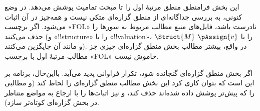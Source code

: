 \documentclass[../../include/open-logic-part]{subfiles}
\begin{document}

\begin{editorial}
  این بخش فرامنطق منطق مرتبهٔ اول را تا مبحث تمامیت پوشش می‌دهد. در وضع
  کنونی، به بررسی جداگانه‌ای از منطق گزاره‌ای متکی نیست و همه‌چیز در آن
  اثبات می‌شود. اگر برچسب «FOL» نادرست باشد، فایل‌های منبع مطالب مربوط
  به سورها را حذف می‌کنند (و «!!{structure}» را با «!!{valuation}»،
  $\Struct{M}$ را با $\pAssign{v}$ و مانند آن جایگزین می‌کنند). در واقع،
  بیشتر مطالب بخش منطق گزاره‌ای چیزی جز مطالب مرتبهٔ اول با برچسب
  «FOL» خاموش نیست.

  اگر بخش منطق گزاره‌ای گنجانده شود، تکرار فراوانی پدید می‌آید. بااین‌حال،
  برنامه بر این است که بتوان کاری کرد این بخش مطالب منطق گزاره‌ای را
  لحاظ کند (و مطالبی را که پیش‌تر پوشش داده شده‌اند حذف کند، و نیز
  اثبات‌ها را با ارجاع به مواضع متناظر در بخش گزاره‌ای کوتاه‌تر سازد).
\end{editorial}












\OLEndPartHook
\end{document}

